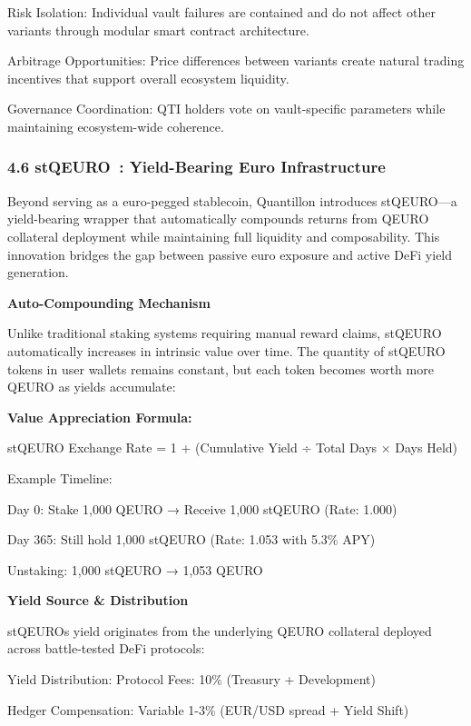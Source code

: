 Risk Isolation: Individual vault failures are contained and do not
affect other variants through modular smart contract architecture.

Arbitrage Opportunities: Price differences between variants create
natural trading incentives that support overall ecosystem liquidity.

Governance Coordination: QTI holders vote on vault-specific parameters
while maintaining ecosystem-wide coherence.

\hypertarget{stqeuro-yield-bearing-euro-infrastructure}{%
\subsubsection{4.6 stQEURO~: Yield-Bearing Euro
Infrastructure}\label{stqeuro-yield-bearing-euro-infrastructure}}

Beyond serving as a euro-pegged stablecoin, Quantillon introduces
stQEURO---a yield-bearing wrapper that automatically compounds returns
from QEURO collateral deployment while maintaining full liquidity and
composability. This innovation bridges the gap between passive euro
exposure and active DeFi yield generation.

\textbf{Auto-Compounding Mechanism}

Unlike traditional staking systems requiring manual reward claims,
stQEURO automatically increases in intrinsic value over time. The
quantity of stQEURO tokens in user wallets remains constant, but each
token becomes worth more QEURO as yields accumulate:

\textbf{Value Appreciation Formula:}

stQEURO Exchange Rate = 1 + (Cumulative Yield ÷ Total Days × Days Held)

Example Timeline:

Day 0: Stake 1,000 QEURO → Receive 1,000 stQEURO (Rate: 1.000)

Day 365: Still hold 1,000 stQEURO (Rate: 1.053 with 5.3\% APY)

Unstaking: 1,000 stQEURO → 1,053 QEURO

\textbf{Yield Source \& Distribution}

stQEURO\textquotesingle s yield originates from the underlying QEURO
collateral deployed across battle-tested DeFi protocols:

Yield Distribution: Protocol Fees: 10\% (Treasury + Development)

Hedger Compensation: Variable 1-3\% (EUR/USD spread + Yield Shift)

